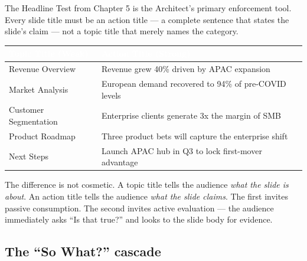 The Headline Test from Chapter 5 is the Architect's primary enforcement tool. Every slide title must be an action title --- a complete sentence that states the slide's claim --- not a topic title that merely names the category.

\begin{center}
\small
{}
\begin{tabularx}{\textwidth}{>{\color{signalred}}X >{\color{techteal}}X}
\toprule
\rowcolor{tableheader}
\textcolor{white}{\textbf{Topic Title (Weak)}} & \textcolor{white}{\textbf{Action Title (Strong)}} \\
\midrule
Revenue Overview & Revenue grew 40\% driven by APAC expansion \\
Market Analysis & European demand recovered to 94\% of pre-COVID levels \\
Customer Segmentation & Enterprise clients generate 3x the margin of SMB \\
Product Roadmap & Three product bets will capture the enterprise shift \\
Next Steps & Launch APAC hub in Q3 to lock first-mover advantage \\
\bottomrule
\end{tabularx}
\end{center}

\vspace{0.5em}

The difference is not cosmetic. A topic title tells the audience \emph{what the slide is about}. An action title tells the audience \emph{what the slide claims}. The first invites passive consumption. The second invites active evaluation --- the audience immediately asks ``Is that true?'' and looks to the slide body for evidence.



\subsection{The ``So What?'' cascade}


